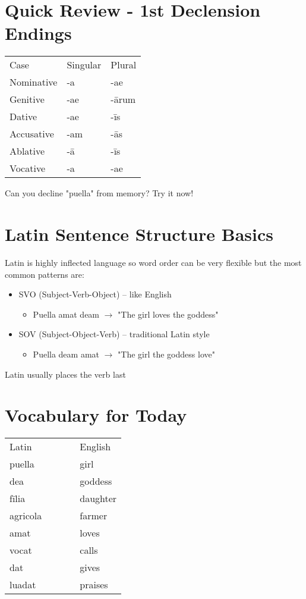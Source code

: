 \section*{Quick Review - 1st Declension Endings}
\begin{tabular}{lll}
  Case & Singular & Plural \\ 
  Nominative & -a & -ae \\ 
  Genitive & -ae & -ārum \\ 
  Dative & -ae & -īs \\ 
  Accusative & -am & -ās \\ 
  Ablative & -ā & -īs \\ 
  Vocative & -a & -ae
\end{tabular}
Can you decline "puella" from memory? Try it now!
\section*{Latin Sentence Structure Basics}
Latin is highly inflected language so word order can be very
flexible but the most common patterns are:
\begin{itemize}
  \item SVO (Subject-Verb-Object) -- like English 
  \begin{itemize}
      \item Puella amat deam $\longrightarrow$ "The girl loves the goddess" 
  \end{itemize}
  \item SOV (Subject-Object-Verb) -- traditional Latin style 
  \begin{itemize}
    \item Puella deam amat $\longrightarrow$ "The girl the goddess love"
  \end{itemize}
\end{itemize}
Latin usually places the verb last
\section*{Vocabulary for Today}
\begin{center}
  \begin{tabular}{lllll}
    Latin & & & & English \\
    puella & & & & girl \\ 
    dea & & & & goddess \\ 
    fīlia & & & & daughter \\ 
    agricola & & & & farmer \\ 
    amat & & & & loves \\ 
    vocat & & & & calls \\ 
    dat & & & & gives \\ 
    luadat & & & & praises \\
  \end{tabular} 
\end{center}
